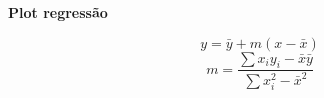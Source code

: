 \documentclass[a4paper, 12pt]{article}
\newcommand{\soma}{\displaystyle \sum}
\begin{document}
    \begin{center}
        \textbf{Plot regressão}
    \end{center}

    $$y = \bar{y} + m(x - \bar{x})$$
    $$m = \frac{\soma{x_i y_i - \bar{x}\bar{y}}} {\soma{x_i^2}-\bar{x}^2}$$
\end{document}
